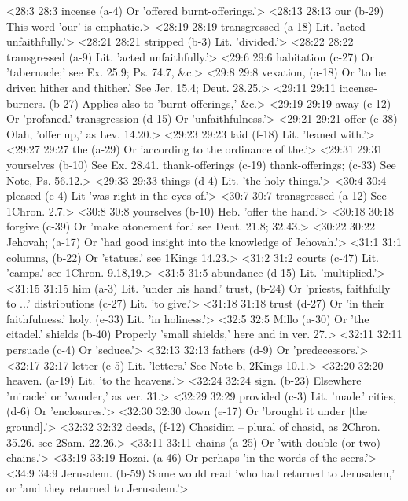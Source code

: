 <28:3 28:3  incense (a-4)  Or 'offered burnt-offerings.'>
<28:13 28:13  our (b-29)  This word 'our' is emphatic.>
<28:19 28:19  transgressed (a-18) Lit. 'acted unfaithfully.'>
<28:21 28:21  stripped (b-3)  Lit. 'divided.'>
<28:22 28:22  transgressed (a-9)  Lit. 'acted unfaithfully.'>
<29:6 29:6  habitation (c-27)  Or 'tabernacle;' see Ex. 25.9; Ps. 74.7, &c.>
<29:8 29:8  vexation, (a-18)  Or 'to be driven hither and thither.' See Jer. 15.4; Deut. 28.25.>
<29:11 29:11  incense-burners. (b-27)  Applies also to 'burnt-offerings,' &c.>
<29:19 29:19  away (c-12)  Or 'profaned.'
  transgression (d-15)  Or 'unfaithfulness.'>
<29:21 29:21  offer (e-38)  Olah, 'offer up,' as Lev. 14.20.>
<29:23 29:23  laid (f-18)  Lit. 'leaned with.'>
<29:27 29:27  the (a-29)  Or 'according to the ordinance of the.'>
<29:31 29:31  yourselves (b-10)  See Ex. 28.41.
  thank-offerings (c-19)  thank-offerings; (c-33)
  See Note, Ps. 56.12.>
<29:33 29:33  things (d-4)  Lit. 'the holy things.'>
<30:4 30:4  pleased (e-4)  Lit 'was right in the eyes of.'>
<30:7 30:7  transgressed (a-12)  See 1Chron. 2.7.>
<30:8 30:8  yourselves (b-10)  Heb. 'offer the hand.'>
<30:18 30:18  forgive (c-39)  Or 'make atonement for.' see Deut. 21.8; 32.43.>
<30:22 30:22  Jehovah; (a-17)  Or 'had good insight into the knowledge of Jehovah.'>
<31:1 31:1  columns, (b-22)  Or 'statues.' see 1Kings 14.23.>
<31:2 31:2  courts (c-47)  Lit. 'camps.' see 1Chron. 9.18,19.>
<31:5 31:5  abundance (d-15)  Lit. 'multiplied.'>
<31:15 31:15  him (a-3)  Lit. 'under his hand.'
  trust, (b-24)  Or 'priests, faithfully to ...'
  distributions (c-27)  Lit. 'to give.'>
<31:18 31:18  trust (d-27)  Or 'in their faithfulness.'
  holy. (e-33)  Lit. 'in holiness.'>
<32:5 32:5  Millo (a-30)  Or 'the citadel.'
  shields (b-40)  Properly 'small shields,' here and in ver. 27.>
<32:11 32:11  persuade (c-4)  Or 'seduce.'>
<32:13 32:13  fathers (d-9)  Or 'predecessors.'>
<32:17 32:17  letter (e-5)  Lit. 'letters.' See Note b, 2Kings 10.1.>
<32:20 32:20  heaven. (a-19)  Lit. 'to the heavens.'>
<32:24 32:24  sign. (b-23)  Elsewhere 'miracle' or 'wonder,' as ver. 31.>
<32:29 32:29  provided (c-3)  Lit. 'made.'
  cities, (d-6)  Or 'enclosures.'>
<32:30 32:30  down (e-17)  Or 'brought it under [the ground].'>
<32:32 32:32  deeds, (f-12)  Chasidim -- plural of chasid, as 2Chron. 35.26. see 2Sam. 22.26.>
<33:11 33:11  chains (a-25)  Or 'with double (or two) chains.'>
<33:19 33:19  Hozai. (a-46)  Or perhaps 'in the words of the seers.'>
<34:9 34:9  Jerusalem. (b-59)  Some would read 'who had returned to Jerusalem,' or 'and they  returned to Jerusalem.'>
